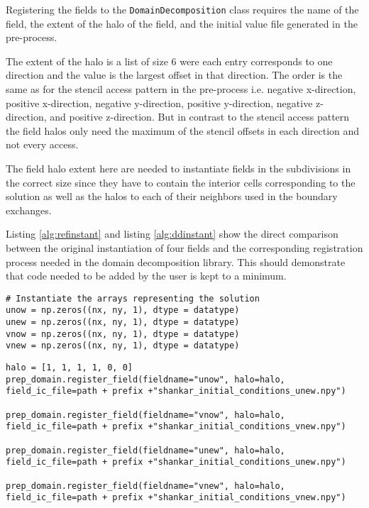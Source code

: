 Registering the fields to the \texttt{DomainDecomposition} class requires the name of the field, the extent of the halo of the field, and the initial value file generated in the pre-process.

The extent of the halo is a list of size 6 were each entry corresponds to one direction and the value is the largest offset in that direction.
The order is the same as for the stencil access pattern in the pre-process i.e. negative x-direction, positive x-direction, negative y-direction, positive y-direction, negative z-direction, and positive z-direction.
But in contrast to the stencil access pattern the field halos only need the maximum of the stencil offsets in each direction and not every access.

The field halo extent here are needed to instantiate fields in the subdivisions in the correct size since they have to contain the interior cells corresponding to the solution as well as the halos to each of their neighbors used in the boundary exchanges.

Listing \ref{alg:refinstant} and listing \ref{alg:ddinstant} show the direct comparison between the original instantiation of four fields and the corresponding registration process needed in the domain decomposition library.
This should demonstrate that code needed to be added by the user is kept to a minimum.

\begin{lstlisting}[caption={Example code for the original user field instantiation.},captionpos=b, label={alg:refinstant}, float, floatplacement=H]
# Instantiate the arrays representing the solution
unow = np.zeros((nx, ny, 1), dtype = datatype)
unew = np.zeros((nx, ny, 1), dtype = datatype)
vnow = np.zeros((nx, ny, 1), dtype = datatype)
vnew = np.zeros((nx, ny, 1), dtype = datatype)
\end{lstlisting} 

\begin{lstlisting}[caption={Example code for the same field instantiation using the domain decomposition library.},captionpos=b, label={alg:ddinstant}, float, floatplacement=H]
halo = [1, 1, 1, 1, 0, 0]
prep_domain.register_field(fieldname="unow", halo=halo, field_ic_file=path + prefix +"shankar_initial_conditions_unew.npy")

prep_domain.register_field(fieldname="vnow", halo=halo, field_ic_file=path + prefix +"shankar_initial_conditions_vnew.npy")

prep_domain.register_field(fieldname="unew", halo=halo, field_ic_file=path + prefix +"shankar_initial_conditions_unew.npy")

prep_domain.register_field(fieldname="vnew", halo=halo, field_ic_file=path + prefix +"shankar_initial_conditions_vnew.npy")
\end{lstlisting}

